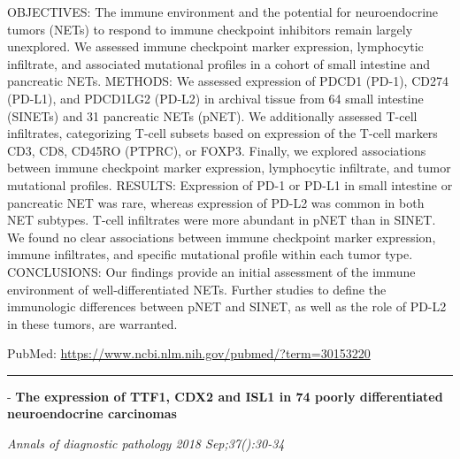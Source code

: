 \documentclass[]{article}
\begin{document}
OBJECTIVES: The immune environment and the potential for neuroendocrine
tumors (NETs) to respond to immune checkpoint inhibitors remain largely
unexplored. We assessed immune checkpoint marker expression, lymphocytic
infiltrate, and associated mutational profiles in a cohort of small
intestine and pancreatic NETs. METHODS: We assessed expression of PDCD1
(PD-1), CD274 (PD-L1), and PDCD1LG2 (PD-L2) in archival tissue from 64
small intestine (SINETs) and 31 pancreatic NETs (pNET). We additionally
assessed T-cell infiltrates, categorizing T-cell subsets based on
expression of the T-cell markers CD3, CD8, CD45RO (PTPRC), or FOXP3.
Finally, we explored associations between immune checkpoint marker
expression, lymphocytic infiltrate, and tumor mutational profiles.
RESULTS: Expression of PD-1 or PD-L1 in small intestine or pancreatic
NET was rare, whereas expression of PD-L2 was common in both NET
subtypes. T-cell infiltrates were more abundant in pNET than in SINET.
We found no clear associations between immune checkpoint marker
expression, immune infiltrates, and specific mutational profile within
each tumor type. CONCLUSIONS: Our findings provide an initial assessment
of the immune environment of well-differentiated NETs. Further studies
to define the immunologic differences between pNET and SINET, as well as
the role of PD-L2 in these tumors, are warranted.

PubMed: \url{https://www.ncbi.nlm.nih.gov/pubmed/?term=30153220}

{}

{}

\begin{center}\rule{0.5\linewidth}{\linethickness}\end{center}

 - \textbf{The expression of TTF1, CDX2 and ISL1 in 74 poorly
differentiated neuroendocrine carcinomas}

\emph{Annals of diagnostic pathology 2018 Sep;37():30-34}
\end{document}

